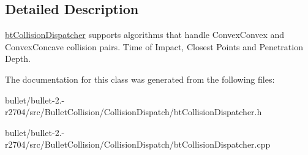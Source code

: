 \subsection{Detailed Description}
\hyperlink{classbt_collision_dispatcher}{bt\+Collision\+Dispatcher} supports algorithms that handle Convex\+Convex and Convex\+Concave collision pairs. Time of Impact, Closest Points and Penetration Depth. 

The documentation for this class was generated from the following files\+:\begin{DoxyCompactItemize}
\item 
bullet/bullet-\/2.-\/r2704/src/\+Bullet\+Collision/\+Collision\+Dispatch/bt\+Collision\+Dispatcher.\+h\item 
bullet/bullet-\/2.-\/r2704/src/\+Bullet\+Collision/\+Collision\+Dispatch/bt\+Collision\+Dispatcher.\+cpp\end{DoxyCompactItemize}
